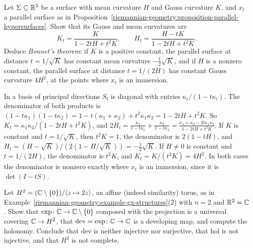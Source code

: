 \begin{exercise}\label{riemannian-geometry:exercise-parallel-surface-curvature}
Let $\Sigma \subseteq \mathbb{R}^3$ be a surface with mean curvature $H$ and Gauss curvature $K$, and $x_t$ a parallel surface as in Proposition~\ref{riemannian-geometry:proposition-parallel-hypersurfaces}. Show that its Gauss and
mean curvatures are
\[
K_t = \frac{K}{1 - 2tH + t^2K}, \qquad H_t = \frac{H - tK}{1 - 2tH + t^2K} .
\]
Deduce \emph{Bonnet's theorem}: if $K$ is a positive constant, the parallel surface at distance $t = 1/\sqrt K$ has constant mean curvature $-\frac12\sqrt K$, and if $H$ is a nonzero constant, the
parallel surface at distance $t = 1/(2H)$ has constant Gauss curvature $4H^2$, at the points where $x_t$ is an immersion.
\end{exercise}

\begin{solution}
In a basis of principal directions $S_t$ is diagonal with entries $\kappa_i/(1 - t\kappa_i)$. The denominator of both products is $(1 - t\kappa_1)(1 - t\kappa_2) = 1 - t(\kappa_1 + \kappa_2) + t^2\kappa_1\kappa_2 = 1 - 2tH + t^2K$. So
$K_t = \kappa_1\kappa_2/(1 - 2tH + t^2K)$, and $2H_t = \frac{\kappa_1}{1 - t\kappa_1} + \frac{\kappa_2}{1 - t\kappa_2} = \frac{\kappa_1 + \kappa_2 - 2t\kappa_1\kappa_2}{1 - 2tH + t^2K}$. If $K$ is constant and $t = 1/\sqrt K$, then $t^2K = 1$, the
denominator is $2(1 - tH)$, and $H_t = (H - \sqrt K)/(2(1 - H/\sqrt K)) = -\frac12\sqrt K$. If $H \neq 0$ is constant and $t = 1/(2H)$, the denominator is $t^2K$, and $K_t = K/(t^2K) = 4H^2$. In both cases
the denominator is nonzero exactly where $x_t$ is an immersion, since it is $\det(I - tS)$.
\end{solution}

\begin{exercise}\label{riemannian-geometry:exercise-hopf-torus}
Let $H^2 = (\mathbb{C} \setminus \{0\})/\langle z \mapsto 2z\rangle$, an affine (indeed similarity) torus, as in Example~\ref{riemannian-geometry:example-gx-structures}(2) with $n = 2$ and $\mathbb{R}^2 = \mathbb{C}$. Show that $\exp \colon \mathbb{C} \to \mathbb{C} \setminus \{0\}$
composed with the projection is a universal covering $\mathbb{C} \to H^2$, that $\mathrm{dev} = \exp \colon \mathbb{C} \to \mathbb{C}$ is a developing map, and compute the holonomy. Conclude that $\mathrm{dev}$ is neither injective nor surjective, that
$\mathrm{hol}$ is not injective, and that $H^2$ is not complete.
\end{exercise}

